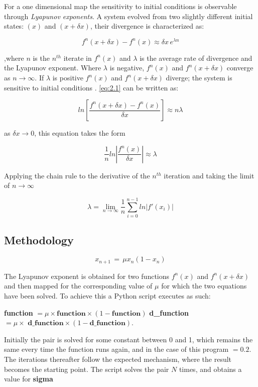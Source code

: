 For a one dimensional map the sensitivity to initial
conditions is observable through \textit{Lyapunov exponents}.
A system evolved from two slightly different initial states: 
$(x)$ and $(x+\delta x)$, their divergence is characterized as:

\begin{equation}
\label{eq:2.1}
    f^n (x+\delta x) - f^n (x) \approx \delta x\, e^{\lambda n}
\end{equation}

,where $n$ is the $n^{th}$ iterate in $f^n (x)$ and 
$\lambda$ is the average rate of divergence and the Lyapunov exponent.
Where $\lambda$ is negative, $f^n (x)$ and $f^n (x+\delta x)$ 
converge as $n \to \infty$. If $\lambda$ is positive 
$f^n (x)$ and $f^n (x+\delta x)$ diverge; the system 
is sensitive to initial conditions \cite{baker}.
\eqref{eq:2.1} can be written as:

$$
ln \left[ \frac{f^n (x+\delta x) - f^n (x)}{\delta x} \right] \approx n \lambda
$$

as $\delta x \to 0$, this equation takes the form

$$
\frac{1}{n} ln\left| \frac{f^n (x)}{\delta x} \right| \approx \lambda
$$

Applying the chain rule to the derivative of 
the $n^{th}$ iteration and taking the limit of $n \to \infty$

\begin{equation}
    \label{eq:2.2}
    \lambda = \lim_{n\to\infty} \frac{1}{n} \sum_{i=0}^{n-1} ln|f'(x_i)|
\end{equation}
\subsection{Methodology}
$$
x_{n+1}\, =\, \mu x_n ( 1 - x_n)
$$

The Lyapunov exponent is obtained for two functions 
$f^n (x)$ and $f^n (x+\delta x)$ and then mapped for
the corresponding value of $\mu$ for which the two 
equations have been solved.
To achieve this a Python script executes as such:

\textbf{function} $= \mu \times \textbf{function} \times (1 - \textbf{function})$
\textbf{d\_function} $= \mu \times \textbf{ d\_function} \times (1 - \textbf{d\_function})$.

Initially the pair is solved for some constant 
between 0 and 1, which remains the same every 
time the function runs again, and 
in the case of this program $=0.2$. The iterations 
thereafter follow the expected mechanism, where 
the result becomes the starting point.
The script solves the pair $N$ times, and obtains 
a value for \textbf{sigma}

